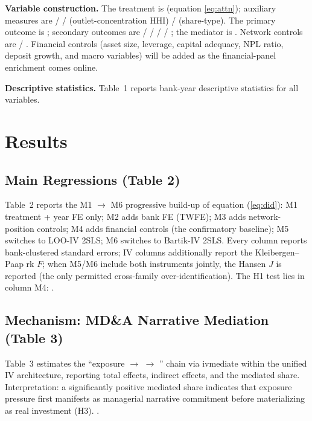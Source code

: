 \textbf{Variable construction.} The treatment is
 (equation \ref{eq:attn}); auxiliary measures are
 /  /
 (outlet-concentration HHI) /
 (share-type). The primary outcome is
; secondary outcomes are
 /  /
 /  /
; the mediator is .
Network controls are  / .
Financial controls (asset size, leverage, capital adequacy, NPL ratio, deposit
growth, and macro variables) will be added as the financial-panel enrichment
comes online.

\textbf{Descriptive statistics.} Table~1 reports bank-year descriptive
statistics for all variables. 

\section{Results}\label{sec:results}

\subsection{Main Regressions (Table 2)}
Table~2 reports the M1 $\to$ M6 progressive build-up of equation
(\ref{eq:did}): M1 treatment + year FE only; M2 adds bank FE (TWFE); M3 adds
network-position controls; M4 adds financial controls (the confirmatory
baseline); M5 switches to LOO-IV 2SLS; M6 switches to Bartik-IV 2SLS. Every
column reports bank-clustered standard errors; IV columns additionally report
the Kleibergen--Paap rk $F$; when M5/M6 include both instruments jointly, the
Hansen $J$ is reported (the only permitted cross-family over-identification).
The H1 test lies in column M4:
.

\subsection{Mechanism: MD\&A Narrative Mediation (Table 3)}
Table~3 estimates the ``exposure $\to$  $\to$
'' chain via ivmediate
\parencite{dippel2020ivmediate} within the unified IV architecture, reporting
total effects, indirect effects, and the mediated share. Interpretation: a
significantly positive mediated share indicates that exposure pressure first
manifests as managerial narrative commitment before materializing as real
investment (H3). .

